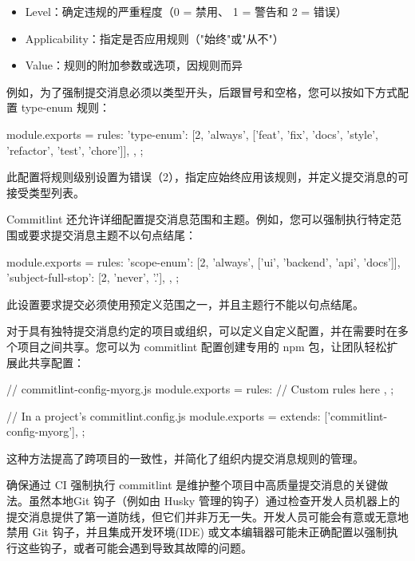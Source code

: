 \begin{itemize}
\item
Level：确定违规的严重程度（0 = 禁用、 1 = 警告和 2 = 错误）

\item
Applicability：指定是否应用规则（"始终"或"从不"）

\item
Value：规则的附加参数或选项，因规则而异
\end{itemize}

例如，为了强制提交消息必须以类型开头，后跟冒号和空格，您可以按如下方式配置 type-enum 规则：

\begin{shell}
module.exports = {
    rules: {
        'type-enum': [2, 'always', ['feat', 'fix', 'docs', 'style',
        'refactor', 'test', 'chore']],
    },
};
\end{shell}

此配置将规则级别设置为错误（2），指定应始终应用该规则，并定义提交消息的可接受类型列表。


Commitlint 还允许详细配置提交消息范围和主题。例如，您可以强制执行特定范围或要求提交消息主题不以句点结尾：

\begin{shell}
module.exports = {
    rules: {
        'scope-enum': [2, 'always', ['ui', 'backend', 'api', 'docs']],
        'subject-full-stop': [2, 'never', '.'],
    },
};
\end{shell}

此设置要求提交必须使用预定义范围之一，并且主题行不能以句点结尾。


对于具有独特提交消息约定的项目或组织，可以定义自定义配置，并在需要时在多个项目之间共享。您可以为 commitlint 配置创建专用的 npm 包，让团队轻松扩展此共享配置：

\begin{shell}
// commitlint-config-myorg.js
module.exports = {
    rules: {
        // Custom rules here
    },
};

// In a project's commitlint.config.js
module.exports = {
    extends: ['commitlint-config-myorg'],
};
\end{shell}

这种方法提高了跨项目的一致性，并简化了组织内提交消息规则的管理。


确保通过 CI 强制执行 commitlint 是维护整个项目中高质量提交消息的关键做法。虽然本地Git 钩子（例如由 Husky 管理的钩子）通过检查开发人员机器上的提交消息提供了第一道防线，但它们并非万无一失。开发人员可能会有意或无意地禁用 Git 钩子，并且集成开发环境(IDE) 或文本编辑器可能未正确配置以强制执行这些钩子，或者可能会遇到导致其故障的问题。

